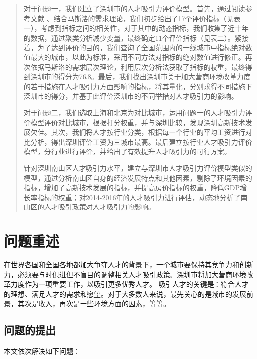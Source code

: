 \documentclass[withoutpreface,bwprint]{cumcmthesis} %
\title{}
\begin{document}
 \maketitle
 \begin{abstract}
对于问题一，我们建立了深圳市的人才吸引力评价模型。首先，通过阅读参考文献 、结合马斯洛的需求理论，我们初步给出了17个评价指标（见表一），考虑到指标之间的相关性，对于其中的动态指标，我们收集了近十年的数据，通过聚类分析减少变量，最终确定11个评价指标（见表二）。紧接着，为了达到评价的目的，我们查询了全国范围内的一线城市中指标绝对数值最大的城市，以此为标准，采用不同方法对指标的绝对数值进行修正。再次依据马斯洛的需求层次理论，利用层次分析法获取了指标的权重，最终得到深圳市的得分为76.8。最后，我们找出深圳市关于加大营商环境改革力度的若干措施在人才吸引力方面影响的指标，将其量化，分别求得不同措施下深圳市的得分，并基于此评价深圳市的不同举措对人才吸引力的影响。

对于问题二，我们选取上海和北京为对比城市，运用问题一的人才吸引力评价模型评价对比城市，根据打分权重，并与深圳比较，发现深圳高新技术发展欠佳。其次，我们将人才按行业分类，根据每一个行业的平均工资进行对比分析，得出深圳评价工资为三城市最高。最后建立按行业人才吸引力评价模型，分行业进行评价，并给出了有效提升人才吸引力的可行方案。

针对深圳南山区人才吸引力水平，建立与深圳市人才吸引力评价模型类似的模型，通过分析南山区自身的经济发展特点和其他因素，剔除了环境因素的指标，增加了高新技术发展的指标，并提高房价指标的权重，降低GDP增长率指标的权重；对2014-2016年的人才吸引力进行评估，动态地分析了南山区的人才吸引政策对人才吸引力的影响。

\end{abstract}

\tableofcontents
\newpage
\section{问题重述}
  在世界各国和全国各地都加大争夺人才的背景下，一个城市要保持其竞争力和创新力，必须要与时俱进但不盲目的调整相关人才吸引政策。深圳市将加大营商环境改革力度作为一项重要工作，以吸引更多优秀人才。
      吸引人才的关键是：符合人才的理想、满足人才的需求和愿望。对于大多数人来说，最先关心的是城市的发展前景，其次是收入，再次是一些环境方面的因素，等等。
\subsection{问题的提出}

本文依次解决如下问题：
\end{document}

